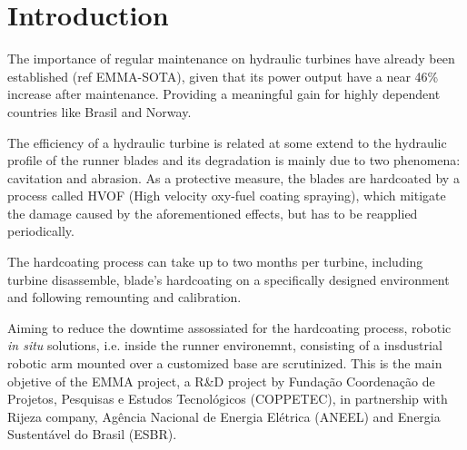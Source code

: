 \section{Introduction}


The importance of regular maintenance on hydraulic turbines have already been
established (ref EMMA-SOTA), given that its power output have a near 46\%
increase after maintenance. Providing a meaningful gain for highly dependent
countries like Brasil and Norway.


The efficiency of a hydraulic turbine is related at some extend to the hydraulic
profile of the runner blades and its degradation is mainly due to two
phenomena: cavitation and abrasion. As a protective measure, the blades are
hardcoated by a process called HVOF (High velocity oxy-fuel coating spraying),
which mitigate the damage caused by the aforementioned effects, but has to be
reapplied periodically.

The hardcoating process can take up to two months per turbine, including turbine
disassemble, blade's hardcoating on a specifically designed environment and
following remounting and calibration.



Aiming to reduce the downtime assossiated for the hardcoating process, robotic
\textit{in situ} solutions, i.e. inside the runner environemnt, consisting of a
insdustrial robotic arm mounted over a customized base are scrutinized. This is
the main objetive of the EMMA project, a R\&D project by Fundação Coordenação
de Projetos, Pesquisas e Estudos Tecnológicos (COPPETEC), in partnership with
Rijeza company, Agência Nacional de Energia Elétrica (ANEEL) and Energia
Sustentável do Brasil (ESBR).

